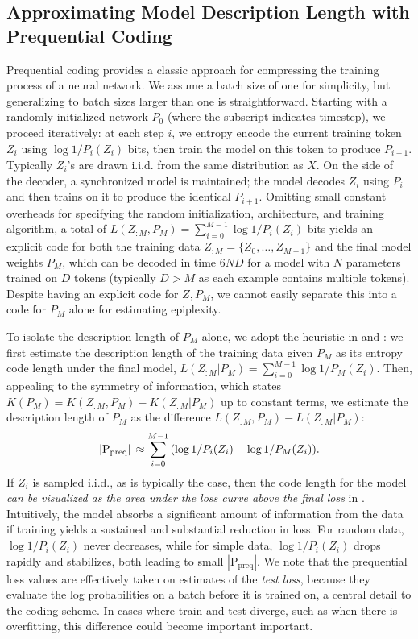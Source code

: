 \documentclass[twoside]{article}
\begin{document}
\subsection{Approximating Model Description Length with Prequential Coding}\label{sec:preq}
Prequential coding provides a classic approach for compressing the training process of a neural network. We assume a batch size of one for simplicity, but generalizing to batch sizes larger than one is straightforward. Starting with a randomly initialized network $P_0$ (where the subscript indicates timestep), we proceed iteratively: at each step $i$, we entropy encode the current training token $Z_i$ using $\log 1/P_i(Z_i)$ bits, then train the model on this token to produce $P_{i+1}$. Typically $Z_i$'s are drawn i.i.d. from the same distribution as $X.$ On the side of the decoder, a synchronized model is maintained; the model decodes $Z_i$ using $P_i$ and then trains on it to produce the identical $P_{i+1}$. Omitting small constant overheads for specifying the random initialization, architecture, and training algorithm, a total of $L({Z_{:M}, P_M}) = \sum_{i=0}^{M-1} \log 1/P_i(Z_i)$ bits yields an explicit code for both the training data $Z_{:M} = \{Z_0, \ldots, Z_{M-1}\}$ and the final model weights $P_M$, which can be decoded in time $6ND$ for a model with $N$ parameters trained on $D$ tokens (typically $D> M$ as each example contains multiple tokens). Despite having an explicit code for $Z,P_M$, we cannot easily separate this into a code for $P_M$ alone for estimating epiplexity.

To isolate the description length of $P_M$ alone, we adopt the heuristic in \citet{zhang2020measuring} and \citet{finzi2025compute}: we first estimate the description length of the training data given $P_M$ as its entropy code length under the final model, $L({Z_{:M}|P_M}) = \sum_{i=0}^{M-1} \log 1/P_M(Z_i)$. Then, appealing to the symmetry of information, which states $K(P_M) = K(Z_{:M}, P_M) - K(Z_{:M}|P_M)$ up to constant terms, we estimate the description length of $P_M$ as the difference $L({Z_{:M}, P_M}) - L({Z_{:M} | P_M})$:
\begin{equation}\label{eq:preq}
    |\mathrm{P}_{\mathrm{preq}}| \,\approx \sum_{i=0}^{M-1} \qty(\log 1/P_i(Z_i) - \log 1/P_M(Z_i)).
\end{equation}
If $Z_i$ is sampled i.i.d., as is typically the case, then the code length for the model \emph{can be visualized as the area under the loss curve above the final loss} in . Intuitively, the model absorbs a significant amount of information from the data if training yields a sustained and substantial reduction in loss. For random data, $\log 1/P_i(Z_i)$ never decreases, while for simple data, $\log 1/P_i(Z_i)$ drops rapidly and stabilizes, both leading to small $|\mathrm{P}_{\mathrm{preq}}|.$ We note that the prequential loss values are effectively taken on estimates of the \emph{test loss}, because they evaluate the log probabilities on a batch before it is trained on, a central detail to the coding scheme. In cases where train and test diverge, such as when there is overfitting, this difference could become important important.
\end{document}
